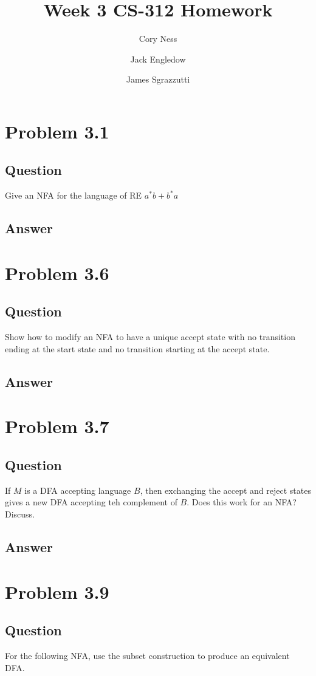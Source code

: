 \documentclass[12pt, a4paper]{article}
\title{Week 3 CS-312 Homework}
\author{
	Cory Ness
	\and
	Jack Engledow
	\and
	James Sgrazzutti
}
\begin{document}
\maketitle

\section{Problem 3.1}
\subsection{Question}
Give an NFA for the language of RE $a^{*}b+b^{*}a$
\subsection{Answer}

\section{Problem 3.6}
\subsection{Question}
Show how to modify an NFA to have a unique accept state with no transition ending at the start state and no transition starting at the accept state.
\subsection{Answer}

\section{Problem 3.7}
\subsection{Question}
If $M$ is a DFA accepting language $B$, then exchanging the accept and reject states gives a new DFA accepting teh complement of $B$. Does this work for an NFA? Discuss.
\subsection{Answer}

\section{Problem 3.9}
\subsection{Question}
For the following NFA, use the subset construction to produce an equivalent DFA.
\end{document}

